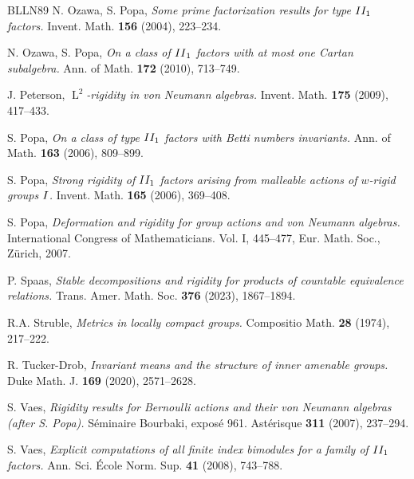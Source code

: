 \documentclass[11pt]{amsart}
\numberwithin{equation}{section}
\theoremstyle{plain}
\theoremstyle{definition}
\newcommand{\rL}{\operatorname{L}}
\begin{document}
\begin{thebibliography}{BLLN89}
 {\sc N. Ozawa, S. Popa}, {\it Some prime factorization results for type ${\rm II_1}$ factors.} Invent. Math. {\bf 156} (2004), 223--234.  

 {\sc N. Ozawa, S. Popa}, {\it On a class of ${\rm{II}_1}$ factors with at most one Cartan subalgebra.} Ann. of Math. {\bf 172} (2010), 713--749.

 {\sc J. Peterson}, {\it $\rL^2$-rigidity in von Neumann algebras.} Invent. Math. {\bf 175} (2009), 417--433.

 {\sc S. Popa}, {\it On a class of type ${\rm II_1}$ factors with Betti numbers invariants.} Ann. of Math. {\bf 163} (2006), 809--899.

 {\sc S. Popa}, {\it Strong rigidity of ${\rm II_1}$ factors arising from malleable actions of $w$-rigid groups ${\rm I}$.} Invent. Math. {\bf 165} (2006), 369--408.

 {\sc S. Popa}, {\it Deformation and rigidity for group actions and von Neumann algebras.} International Congress of Mathematicians. Vol. I, 445--477, Eur. Math. Soc., Z\"urich, 2007.



 {\sc P. Spaas}, {\it Stable decompositions and rigidity for products of countable equivalence relations.} Trans. Amer. Math. Soc. {\bf 376} (2023), 1867--1894.

 {\sc R.A. Struble}, {\it Metrics in locally compact groups.} Compositio Math. {\bf 28} (1974), 217--222.

 {\sc R. Tucker-Drob}, {\it Invariant means and the structure of inner amenable groups.} Duke Math. J. {\bf 169} (2020), 2571--2628. 

 {\sc S. Vaes}, {\it Rigidity results for Bernoulli actions and their von Neumann algebras (after S.\! Popa).} S{\'e}minaire Bourbaki, expos\'e 961. Ast\'erisque {\bf 311} (2007), 237--294.

 {\sc S. Vaes}, {\it Explicit computations of all finite index bimodules for a family of ${\rm II_1}$ factors.} Ann. Sci. \'Ecole Norm. Sup. {\bf 41} (2008), 743--788.


\end{thebibliography}
\end{document}

